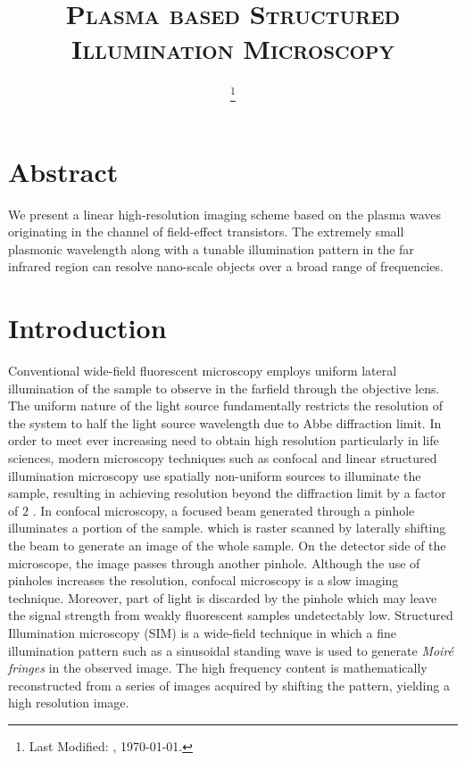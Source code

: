 \documentclass[11pt]{article}
\begin{document}
\title{\textsc{Plasma based Structured Illumination Microscopy}\\}
\date{\footnote{Last Modified: \currenttime, \today.}}
\maketitle


\section{Abstract}
%
﻿We present a linear high-resolution imaging scheme based on the plasma waves originating in the channel of field-effect transistors. The extremely small plasmonic wavelength along with a tunable illumination pattern in the far infrared region can resolve nano-scale objects over a broad range of frequencies.
%
\section{Introduction}
%
Conventional wide-field fluorescent microscopy employs uniform lateral illumination of the sample to observe in the farfield through the objective lens. The uniform nature of the light source fundamentally restricts the resolution of the system to half the light source wavelength due to Abbe diffraction limit. In order to meet ever increasing need to obtain high resolution particularly in life sciences, modern microscopy techniques such as confocal and linear structured illumination microscopy use spatially non-uniform sources to illuminate the sample, resulting in achieving resolution beyond the diffraction limit by a factor of $2$ \cite{Minsky_1988,Gustafsson_2005}. In confocal microscopy, a focused beam generated through a pinhole illuminates a portion of the sample. which is raster scanned by laterally shifting the beam to generate an image of the whole sample. On the detector side of the microscope, the image passes through another pinhole. Although the use of pinholes increases the resolution, confocal microscopy is a slow imaging technique. Moreover, part of light is discarded by the pinhole which may leave the signal strength from weakly fluorescent samples undetectably low. Structured Illumination microscopy (SIM) is a wide-field technique in which a fine illumination pattern such as a sinusoidal standing wave is used to generate \emph{Moiré fringes} in the observed image. The high frequency content is mathematically reconstructed from a series of images acquired by shifting the pattern, yielding a high resolution image.
\end{document}
